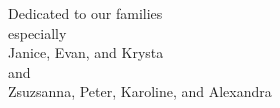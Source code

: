 
\startstandardmakeup
  [
    align=center,
    pagestate=start,
    style=it,
  ]
  
  Dedicated to our families\\
  especially\\
  Janice, Evan, and Krysta\\
  and\\
  Zsuzsanna, Peter, Karoline, and Alexandra

\stopstandardmakeup
